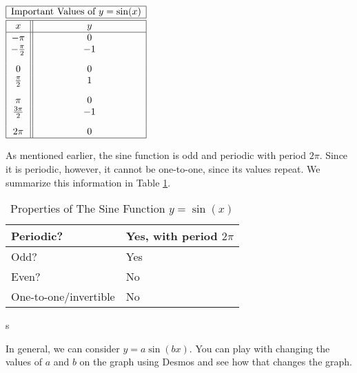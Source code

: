 \documentclass[nooutcomes]{ximera}
\begin{document}
\begin{center}
\(
\begin{array}{ |c || c|  }
 \hline
 \multicolumn{2}{|c|}{\text{\normalfont Important Values of } y=\sin(x)} \\
\hline
 \hline
 x & y\\
 \hline

 -\pi&0\\

 -\frac{\pi}{2}&-1\\[2ex]

 0&0\\

 \frac{\pi}{2}&1\\[2ex]

 \pi&0\\

\frac{3\pi}{2}&-1\\[2ex]

 2 \pi&0\\
\hline
\end{array}
\)
\end{center}

As mentioned earlier, the sine function is odd and periodic with period $2\pi$. Since it is periodic, however, it cannot be one-to-one, since its values repeat. We summarize this information in Table \ref{tab:sineproperties}.

\begin{table}[h]
\caption{\label{tab:sineproperties}Properties of The Sine Function $y = \sin(x)$}
\centering
\begin{tabular}{l|l}
Periodic? & Yes, with period $2\pi$ \\ \hline
Odd? &  Yes \\ \hline
Even? & No \\ \hline
One-to-one/invertible & No
\end{tabular}
\end{table}s

In general, we can consider $y=a\sin(bx)$.  You can play with changing the values of $a$ and $b$ on the graph using Desmos and see how that changes the graph.  

\begin{center}  
\end{center}



\newpage

\end{document}
